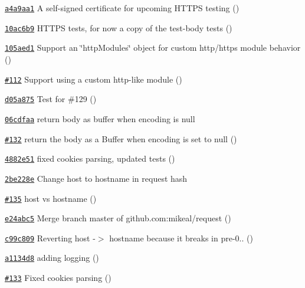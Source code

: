 \begin{DoxyItemize}
\item \href{https://github.com/mikeal/request/commit/a4a9aa199ff958630791e131092ec332ada00a49}{\tt a4a9aa1} A self-\/signed certificate for upcoming H\+T\+T\+P\+S testing ()
\item \href{https://github.com/mikeal/request/commit/10ac6b9db40263bec1bf63ee7e057000ffd2d7e9}{\tt 10ac6b9} H\+T\+T\+P\+S tests, for now a copy of the test-\/body tests ()
\item \href{https://github.com/mikeal/request/commit/105aed1ff99add1957f91df7efabf406e262f463}{\tt 105aed1} Support an \char`\"{}http\+Modules\char`\"{} object for custom http/https module behavior ()
\item \href{https://github.com/mikeal/request/pull/112}{\tt \#112} Support using a custom http-\/like module ()
\item \href{https://github.com/mikeal/request/commit/d05a8753af576fc1adccc7ffe9633690371c05ee}{\tt d05a875} Test for \#129 ()
\item \href{https://github.com/mikeal/request/commit/06cdfaa3c29233dac3f47e156f2b5b3a0f0ae4b8}{\tt 06cdfaa} return body as buffer when encoding is null
\item \href{https://github.com/mikeal/request/pull/132}{\tt \#132} return the body as a Buffer when encoding is set to null ()
\item \href{https://github.com/mikeal/request/commit/4882e519ed6b8d08795da5de37166148ce0ee440}{\tt 4882e51} fixed cookies parsing, updated tests ()
\item \href{https://github.com/mikeal/request/commit/2be228ec8b48a60028bd1d80c8cbebf23964f913}{\tt 2be228e} Change {\ttfamily host} to {\ttfamily hostname} in request hash
\item \href{https://github.com/mikeal/request/pull/135}{\tt \#135} host vs hostname ()
\item \href{https://github.com/mikeal/request/commit/e24abc5cc2c6fa154ae04fe58a16d135eeba4951}{\tt e24abc5} Merge branch \textquotesingle{}master\textquotesingle{} of github.\+com\+:mikeal/request ()
\item \href{https://github.com/mikeal/request/commit/c99c809bb48b9c0193aae3789c5c844f7f6cbe92}{\tt c99c809} Reverting host -\/$>$ hostname because it breaks in pre-\/0.. ()
\item \href{https://github.com/mikeal/request/commit/a1134d855f928fde5c4fe9ee255c111da0195bfc}{\tt a1134d8} adding logging ()
\item \href{https://github.com/mikeal/request/pull/133}{\tt \#133} Fixed cookies parsing ()

\end{DoxyItemize}

